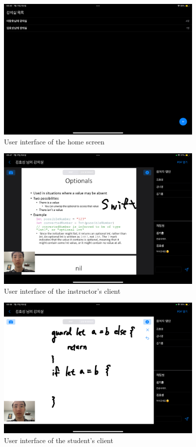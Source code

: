 \documentclass[pdflatex,sn-mathphys-num]{sn-jnl}%
\theoremstyle{thmstyleone}%
\theoremstyle{thmstyletwo}%
\theoremstyle{thmstylethree}%
\begin{document}
\begin{figure}[h]
\centering
\includegraphics[width=0.9\textwidth]{home.PNG}
\caption{User interface of the home screen}\label{fig2}
\end{figure}

\begin{figure}[p]
\centering
\includegraphics[width=0.9\textwidth]{pdf.PNG}
\caption{User interface of the instructor's client}\label{fig3}
\end{figure}

\begin{figure}[p]
\centering
\includegraphics[width=0.9\textwidth]{whiteboard.PNG}
\caption{User interface of the student's client}\label{fig4}
\end{figure}
\end{document}
